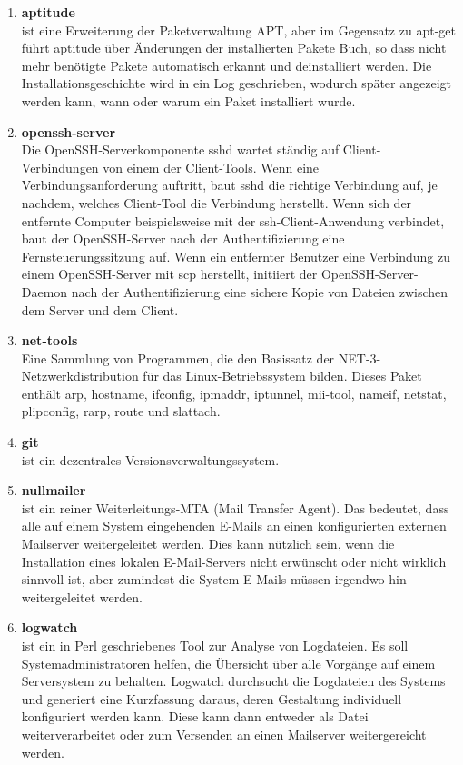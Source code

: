 \begin{enumerate}[label=\textbf{\arabic*.}]
	\item \textbf{aptitude} \\ist eine Erweiterung der Paketverwaltung APT, aber im Gegensatz zu apt-get führt aptitude über Änderungen der installierten Pakete  Buch, so dass nicht mehr benötigte Pakete automatisch erkannt und deinstalliert werden. Die Installationsgeschichte wird in ein Log geschrieben, wodurch später angezeigt werden kann, wann oder warum ein Paket installiert wurde.
	\item \textbf{openssh-server} \\Die OpenSSH-Serverkomponente sshd wartet ständig auf Client-Verbindungen von einem der Client-Tools. Wenn eine Verbindungsanforderung auftritt, baut sshd die richtige Verbindung auf, je nachdem, welches Client-Tool die Verbindung herstellt. Wenn sich der entfernte Computer beispielsweise mit der ssh-Client-Anwendung verbindet, baut der OpenSSH-Server nach der Authentifizierung eine Fernsteuerungssitzung auf. Wenn ein entfernter Benutzer eine Verbindung zu einem OpenSSH-Server mit scp herstellt, initiiert der OpenSSH-Server-Daemon nach der Authentifizierung eine sichere Kopie von Dateien zwischen dem Server und dem Client.
	\item \textbf{net-tools}\\Eine Sammlung von Programmen, die den Basissatz der NET-3-Netzwerkdistribution für das Linux-Betriebssystem bilden. Dieses Paket enthält arp, hostname, ifconfig, ipmaddr, iptunnel, mii-tool, nameif, netstat, plipconfig, rarp, route und slattach.
	\item \textbf{git} \\ist ein dezentrales Versionsverwaltungssystem.
	\item \textbf{nullmailer}\\ist ein reiner Weiterleitungs-MTA (Mail Transfer Agent). Das bedeutet, dass alle auf einem System eingehenden E-Mails an einen konfigurierten externen Mailserver weitergeleitet werden. Dies kann nützlich sein, wenn die Installation eines lokalen E-Mail-Servers nicht erwünscht oder nicht wirklich sinnvoll ist, aber zumindest die System-E-Mails müssen irgendwo hin weitergeleitet werden.
	\item \textbf{logwatch} \\ist ein in Perl geschriebenes Tool zur Analyse von Logdateien. Es soll Systemadministratoren helfen, die Übersicht über alle Vorgänge auf einem Serversystem zu behalten. Logwatch durchsucht die Logdateien des Systems und generiert eine Kurzfassung daraus, deren Gestaltung individuell konfiguriert werden kann. Diese kann dann entweder als Datei weiterverarbeitet oder zum Versenden an einen Mailserver weitergereicht werden.
\end{enumerate}\newpage\pagestyle{scrheadings}

